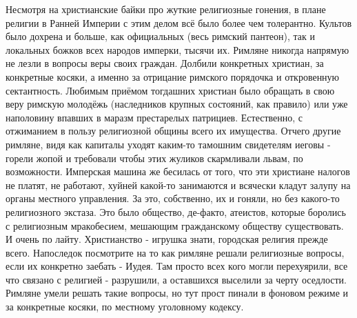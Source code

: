 Несмотря на христианские байки про жуткие религиозные гонения, в плане религии в Ранней Империи с этим делом всё было более чем толерантно. Культов было дохрена и больше, как официальных (весь римский пантеон), так и локальных божков всех народов имперки, тысячи их. Римляне никогда напрямую не лезли в вопросы веры своих граждан. Долбили конкретных христиан, за конкретные косяки, а именно за отрицание римского порядочка и откровенную сектантность. Любимым приёмом тогдашних христиан было обращать в свою веру римскую молодёжь (наследников крупных состояний, как правило) или уже наполовину впавших в маразм престарелых патрициев. Естественно, с отжиманием в пользу религиозной общины всего их имущества. Отчего другие римляне, видя как капиталы уходят каким-то тамошним свидетелям иеговы - горели жопой и требовали чтобы этих жуликов скармливали львам, по возможности. Имперская машина же бесилась от того, что эти христиане налогов не платят, не работают, хуйней какой-то занимаются и всячески кладут залупу на органы местного управления. За это, собственно, их и гоняли, но без какого-то религиозного экстаза. Это было общество, де-факто, атеистов, которые боролись с религиозным мракобесием, мешающим гражданскому обществу существовать. И очень по лайту. Христианство - игрушка знати, городская религия прежде всего. Напоследок посмотрите на то как римляне решали религиозные вопросы, если их конкретно заебать - Иудея. Там просто всех кого могли перехуярили, все что связано с религией - разрушили, а оставшихся выселили за черту оседлости. Римляне умели решать такие вопросы, но тут прост пинали в фоновом режиме и за конкретные косяки, по местному уголовному кодексу.



